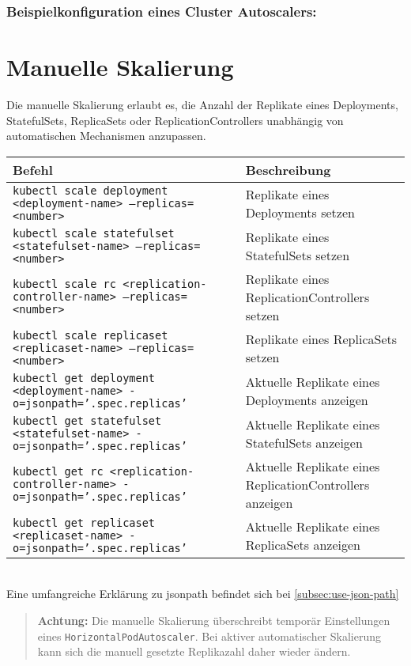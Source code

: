 \subsubsection{Beispielkonfiguration eines Cluster Autoscalers:}


\section{Manuelle Skalierung}
Die manuelle Skalierung erlaubt es, die Anzahl der Replikate eines Deployments, StatefulSets, ReplicaSets oder ReplicationControllers unabhängig von automatischen Mechanismen anzupassen.\\

\noindent
\begin{tabular}{|p{}|p{}|}
\hline
\textbf{Befehl} & \textbf{Beschreibung} \\
\hline
\texttt{kubectl scale deployment <deployment-name> --replicas=<number>} & Replikate eines Deployments setzen \\
\texttt{kubectl scale statefulset <statefulset-name> --replicas=<number>} & Replikate eines StatefulSets setzen \\
\texttt{kubectl scale rc <replication-controller-name> --replicas=<number>} & Replikate eines ReplicationControllers setzen \\
\texttt{kubectl scale replicaset <replicaset-name> --replicas=<number>} & Replikate eines ReplicaSets setzen \\
\texttt{kubectl get deployment <deployment-name> -o=jsonpath='{.spec.replicas}'} & Aktuelle Replikate eines Deployments anzeigen \\
\texttt{kubectl get statefulset <statefulset-name> -o=jsonpath='{.spec.replicas}'} & Aktuelle Replikate eines StatefulSets anzeigen \\
\texttt{kubectl get rc <replication-controller-name> -o=jsonpath='{.spec.replicas}'} & Aktuelle Replikate eines ReplicationControllers anzeigen \\
\texttt{kubectl get replicaset <replicaset-name> -o=jsonpath='{.spec.replicas}'} & Aktuelle Replikate eines ReplicaSets anzeigen  \\
\hline
\end{tabular}
\phantom{.}\\
Eine umfangreiche Erklärung zu jsonpath befindet sich bei \ref{subsec:use-json-path}

\begin{quote}
\textbf{Achtung:} Die manuelle Skalierung überschreibt temporär Einstellungen eines \texttt{HorizontalPodAutoscaler}. Bei aktiver automatischer Skalierung kann sich die manuell gesetzte Replikazahl daher wieder ändern.
\end{quote}

